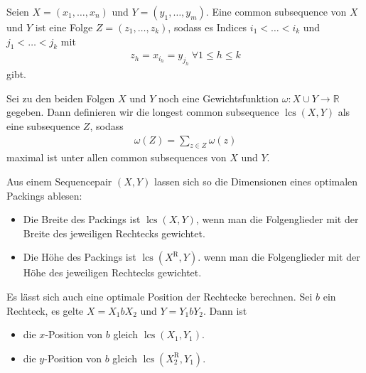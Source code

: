\documentclass{beamer}
\DeclareMathOperator{\lcs}{lcs}
\newcommand{\rev}{^{\operatorname{R}}}
\begin{document}
\begin{frame}
\begin{definition}
 Seien $X= (x_1,\dots,x_n)$ und $Y=(y_1,\dots, y_m)$. Eine common subsequence von $X$ und $Y$ ist eine Folge $Z=(z_1,\dots, z_k)$, sodass es Indices $i_1<\dots< i_k$ und $j_1 <\dots < j_k$ mit
 \begin{align*}
  z_h = x_{i_h} = y_{j_h} ~\forall 1\leq h\leq k
 \end{align*}
 gibt.
\end{definition}
\begin{definition}
 Sei zu den beiden Folgen $X$ und $Y$ noch eine Gewichtsfunktion $\omega: X\cup Y \to \mathbb{R}$ gegeben. Dann definieren wir die longest common subsequence $\lcs(X,Y)$ als eine subsequence $Z$, sodass 
 \begin{align*}
  \omega(Z) = \sum_{z\in Z} \omega(z)
 \end{align*}
 maximal ist unter allen common subsequences von $X$ und $Y$.
\end{definition}
\end{frame}

\begin{frame}
 Aus einem Sequencepair $(X,Y)$ lassen sich so die Dimensionen eines optimalen Packings ablesen:
 \begin{itemize}
   \item Die Breite des Packings ist $\lcs(X,Y)$, wenn man die Folgenglieder mit der Breite des jeweiligen Rechtecks gewichtet.
   \item Die Höhe des Packings ist $\lcs(X\rev, Y)$. wenn man die Folgenglieder mit der Höhe des jeweiligen Rechtecks gewichtet.
 \end{itemize}
 
 Es lässt sich auch eine optimale Position der Rechtecke berechnen. Sei $b$ ein Rechteck, es gelte $X= X_1 b X_2$ und $Y= Y_1 b Y_2$. Dann ist
 \begin{itemize}
   \item die $x$-Position von $b$ gleich $\lcs(X_1,Y_1)$.
   \item die $y$-Position von $b$ gleich $\lcs(X_2\rev, Y_1)$.
 \end{itemize}


\end{frame}
\end{document}

